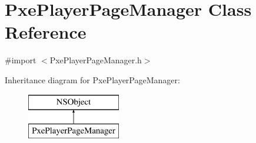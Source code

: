\hypertarget{interface_pxe_player_page_manager}{\section{Pxe\-Player\-Page\-Manager Class Reference}
\label{interface_pxe_player_page_manager}
}


{\ttfamily \#import $<$Pxe\-Player\-Page\-Manager.\-h$>$}

Inheritance diagram for Pxe\-Player\-Page\-Manager\-:\begin{figure}[H]
\begin{center}
\leavevmode
\includegraphics[height=2.000000cm]{interface_pxe_player_page_manager}
\end{center}
\end{figure}
